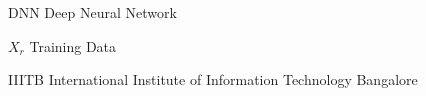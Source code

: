 \begin{abbreviations}
\item[DNN] Deep Neural Network
\item[$X_{r}$] Training Data
\item[IIITB] International Institute of Information Technology Bangalore
\end{abbreviations}
